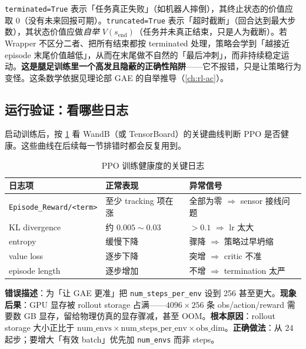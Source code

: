 \begin{insight}\label{ins:rlmc-mgr-term}
\verb|terminated=True| 表示「任务真正失败」（如机器人摔倒），其终止状态的价值应取 0（没有未来回报可期）。\verb|truncated=True| 表示「超时截断」（回合达到最大步数），其状态价值应做\emph{自举} $V(s_{\text{end}})$（任务并未真正结束，只是人为截断）。若 Wrapper 不区分二者、把所有结束都按 terminated 处理，策略会学到「越接近 episode 末尾价值越低」，从而在末尾做不自然的「最后冲刺」，而非持续稳定运动。\textbf{这是腿足训练里一个高发且隐蔽的正确性陷阱}——它不报错，只是让策略行为变怪。这条数学依据见理论部 GAE 的自举推导（\cref{ch:rl-ac}）。
\end{insight}

\subsection{运行验证：看哪些日志}

启动训练后，按 \cref{tab:rlmc-mgr-ppolog} 看 WandB（或 TensorBoard）的关键曲线判断 PPO 是否健康。这些曲线在后续每一节排错时都会反复用到。

\begin{table}[ht]
\centering
\caption{PPO 训练健康度的关键日志}
\label{tab:rlmc-mgr-ppolog}
\small
\begin{tabular}{@{}lll@{}}
\toprule
日志项 & 正常表现 & 异常信号 \\
\midrule
\verb|Episode_Reward/<term>| & 至少 tracking 项在涨 & 全部为零 $\Rightarrow$ sensor 接线问题 \\
KL divergence & 约 $0.005\!\sim\!0.03$ & $>0.1$ $\Rightarrow$ lr 太大 \\
entropy & 缓慢下降 & 骤降 $\Rightarrow$ 策略过早坍缩 \\
value loss & 逐步下降 & 突增 $\Rightarrow$ critic 不准 \\
episode length & 逐步增加 & 不增 $\Rightarrow$ termination 太严 \\
\bottomrule
\end{tabular}
\end{table}

\begin{pitfall}
\textbf{错误描述}：为「让 GAE 更准」把 \verb|num_steps_per_env| 设到 256 甚至更大。\textbf{现象后果}：GPU 显存被 rollout storage 占满——$4096\times256$ 条 obs/action/reward 需要数 GB 显存，留给物理仿真的显存骤减，甚至 OOM。\textbf{根本原因}：rollout storage 大小正比于 $\text{num\_envs}\times\text{num\_steps\_per\_env}\times\text{obs\_dim}$。\textbf{正确做法}：从 24 起步；要增大「有效 batch」优先加 \verb|num_envs| 而非 steps。
\end{pitfall}

